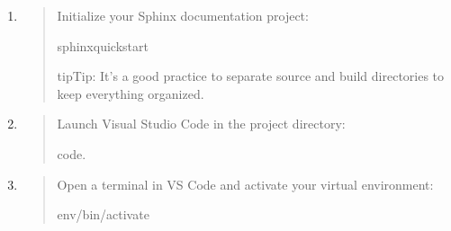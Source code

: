 \documentclass[a4paper,10pt,english]{sphinxmanual}
\begin{document}
\begin{enumerate}
\begin{quote}
\begin{sphinxVerbatim}[commandchars=\\\{\}]
pipinstallsphinx\PYGZus{}rtd\PYGZus{}themesphinx\PYGZhy{}copybuttonsphinx\PYGZus{}code\PYGZus{}tabssphinx\PYGZhy{}new\PYGZhy{}tab\PYGZhy{}link
\end{sphinxVerbatim}
\end{quote}

\item {} 
\sphinxAtStartPar
{}
\begin{quote}

\sphinxAtStartPar
Initialize your Sphinx documentation project:

\begin{sphinxVerbatim}[commandchars=\\\{\}]
sphinx\PYGZhy{}quickstart
\end{sphinxVerbatim}

\begin{sphinxadmonition}{tip}{Tip:}
\sphinxAtStartPar
It’s a good practice to separate source and build directories to keep everything organized.
\end{sphinxadmonition}
\end{quote}

\item {} 
\sphinxAtStartPar
{}
\begin{quote}

\sphinxAtStartPar
Launch Visual Studio Code in the project directory:

\begin{sphinxVerbatim}[commandchars=\\\{\}]
code.
\end{sphinxVerbatim}
\end{quote}

\item {} 
\sphinxAtStartPar
{}
\begin{quote}

\sphinxAtStartPar
Open a terminal in VS Code and activate your virtual environment:

\begin{sphinxVerbatim}[commandchars=\\\{\}]
env/bin/activate
\end{sphinxVerbatim}
\end{quote}


\end{enumerate}
\end{document}
